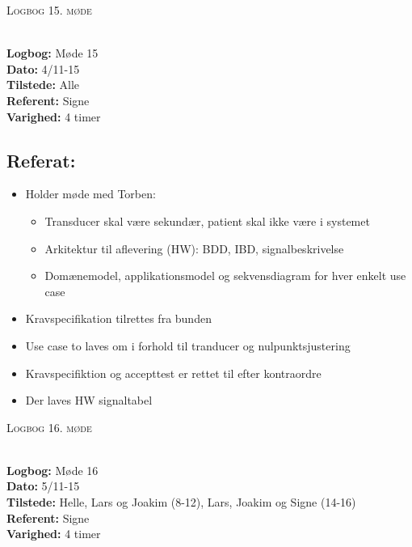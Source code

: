 \documentclass[a4paper,11pt,oneside]{memoir}
\begin{document}
\newpage


\begin{center} 
\huge{\textsc{Logbog 15. møde}}
\end{center}

\textbf{ }
\\
\textbf{Logbog:} Møde 15
\\
\textbf{Dato:} 4/11-15
\\
\textbf{Tilstede:} Alle
\\
\textbf{Referent:} Signe
\\
\textbf{Varighed:} 4 timer
\\

\subsection{Referat:}
\begin{itemize}
\item Holder møde med Torben:
\begin{itemize}
\item Transducer skal være sekundær, patient skal ikke være i systemet
\item Arkitektur til aflevering (HW): BDD, IBD, signalbeskrivelse 
\item Domænemodel, applikationsmodel og sekvensdiagram for hver enkelt use case
\end{itemize}
\item Kravspecifikation tilrettes fra bunden 
\item Use case to laves om i forhold til tranducer og nulpunktsjustering
\item Kravspecifiktion og accepttest er rettet til efter kontraordre
\item Der laves HW signaltabel
\end{itemize}

\newpage


\begin{center} 
\huge{\textsc{Logbog 16. møde}}
\end{center}

\textbf{ }
\\
\textbf{Logbog:} Møde 16
\\
\textbf{Dato:} 5/11-15
\\
\textbf{Tilstede:} Helle, Lars og Joakim (8-12), Lars, Joakim og Signe (14-16)
\\
\textbf{Referent:} Signe
\\
\textbf{Varighed:} 4 timer
\\
\end{document}

